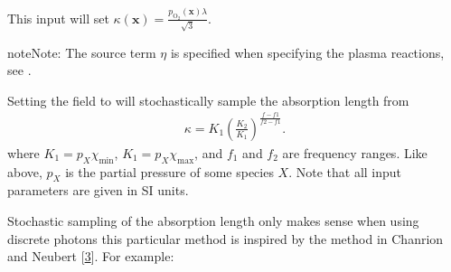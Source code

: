 \documentclass[letterpaper,10pt,english]{sphinxmanual}
\begin{document}
\begin{sphinxVerbatim}[commandchars=\\\{\},formatcom=\scriptsize]
   \PYG{p}{[}
        
        
        
        
   \PYG{p}{]}
\end{sphinxVerbatim}

\sphinxAtStartPar
This input will set \(\kappa\left(\mathbf{x}\right) = \frac{p_{\textrm{O}_2}\left(\mathbf{x}\right)\lambda}{\sqrt{3}}\).

\begin{sphinxadmonition}{note}{Note:}
\sphinxAtStartPar
The source term \(\eta\) is specified when specifying the plasma reactions, see {\hyperref[\detokenize{Applications/CdrPlasmaModel:chap-cdrplasmareactionsjson}]{}}.
\end{sphinxadmonition}

\sphinxAtStartPar
{}

\sphinxAtStartPar
Setting the  field to  will stochastically sample the absorption length from
\begin{equation*}
\begin{split}\kappa = K_1 \left(\frac{K_2}{K_1}\right)^{\frac{f-f1}{f2-f1}}.\end{split}
\end{equation*}
\sphinxAtStartPar
where \(K_1 = p_X\chi_{\textrm{min}}\), \(K_1 = p_X\chi_{\textrm{max}}\), and \(f_1\) and \(f_2\) are frequency ranges.
Like above, \(p_X\) is the partial pressure of some species \(X\).
Note that all input parameters are given in SI units.

\sphinxAtStartPar
Stochastic sampling of the absorption length only makes sense when using discrete photons \textendash{} this particular method is inspired by the method in Chanrion and Neubert {[}\hyperlink{cite.ZZReferences:id163}{3}{]}.
For example:
\end{document}
